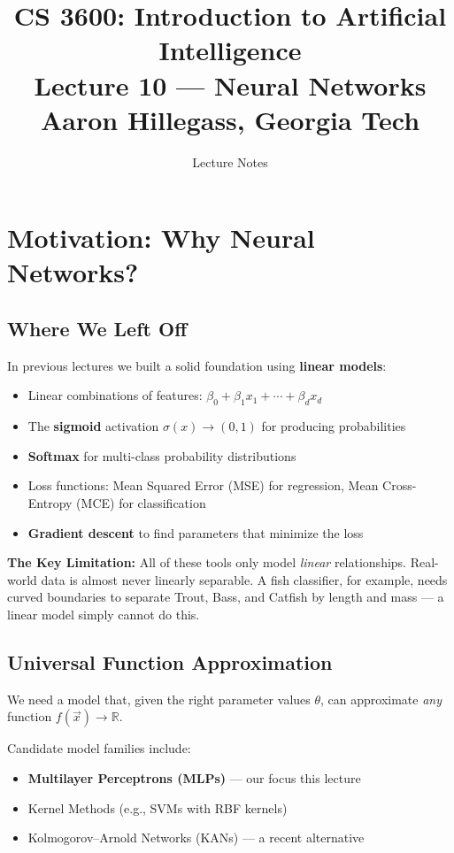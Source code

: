 \documentclass[12pt]{article}
\title{
  \textbf{CS 3600: Introduction to Artificial Intelligence}\\[0.5em]
  \large Lecture 10 --- Neural Networks\\[0.3em]
  \normalsize Aaron Hillegass, Georgia Tech
}
\author{Lecture Notes}
\date{}
\begin{document}
\maketitle
\tableofcontents
\newpage

\section{Motivation: Why Neural Networks?}

\subsection{Where We Left Off}

In previous lectures we built a solid foundation using \textbf{linear models}:
\begin{itemize}
  \item Linear combinations of features: $\beta_0 + \beta_1 x_1 + \cdots + \beta_d x_d$
  \item The \textbf{sigmoid} activation $\sigma(x) \to (0,1)$ for producing probabilities
  \item \textbf{Softmax} for multi-class probability distributions
  \item Loss functions: Mean Squared Error (MSE) for regression, Mean Cross-Entropy (MCE) for classification
  \item \textbf{Gradient descent} to find parameters that minimize the loss
\end{itemize}

\begin{notebox}
\textbf{The Key Limitation:} All of these tools only model \emph{linear} relationships.
Real-world data is almost never linearly separable. A fish classifier, for example,
needs curved boundaries to separate Trout, Bass, and Catfish by length and mass ---
a linear model simply cannot do this.
\end{notebox}

\subsection{Universal Function Approximation}

We need a model that, given the right parameter values $\theta$, can approximate \emph{any} function $f(\vec{x}) \to \mathbb{R}$.

Candidate model families include:
\begin{itemize}
  \item \textbf{Multilayer Perceptrons (MLPs)} --- our focus this lecture
  \item Kernel Methods (e.g., SVMs with RBF kernels)
  \item Kolmogorov--Arnold Networks (KANs) --- a recent alternative
\end{itemize}
\end{document}
